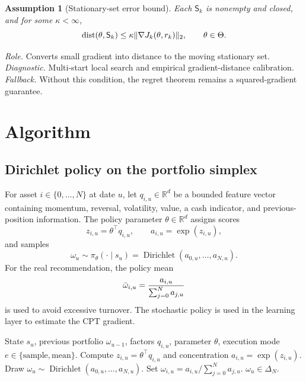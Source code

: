 \documentclass[11pt]{article}
\newtheorem{assumption}[theorem]{Assumption}
\newcommand{\R}{\mathbb R}
\newcommand{\1}{\mathbf 1}
\newcommand{\dist}{\operatorname{dist}}
\DeclarePairedDelimiter{\norm}{\lVert}{\rVert}
\newcommand{\ThetaSet}{\Theta}
\newcommand{\CPT}{\ensuremath{\mathrm{CPT}}\xspace}
\newcommand{\Dir}{\operatorname{Dirichlet}}
\newcommand{\Sta}{\mathsf S}
\begin{document}
\begin{assumption}[Stationary-set error bound]\label{ass:error-bound}
Each $\Sta_k$ is nonempty and closed, and for some $\kappa<\infty$,
\begin{equation}\label{eq:error-bound}
 \dist(\theta,\Sta_k)\le \kappa\norm{\nabla J_k(\theta,r_k)}_2,
 \qquad \theta\in\ThetaSet.
\end{equation}
\end{assumption}
\emph{Role.}  Converts small gradient into distance to the moving stationary set.  \emph{Diagnostic.}  Multi-start local search and empirical gradient-distance calibration.  \emph{Fallback.}  Without this condition, the regret theorem remains a squared-gradient guarantee.

\section{Algorithm}\label{sec:algorithm}

\subsection{Dirichlet policy on the portfolio simplex}

For asset $i\in\{0,\ldots,N\}$ at date $u$, let $q_{i,u}\in\R^d$ be a bounded feature vector containing momentum, reversal, volatility, value, a cash indicator, and previous-position information.  The policy parameter $\theta\in\R^d$ assigns scores
\begin{equation}\label{eq:dir-score}
 z_{i,u}=\theta^\top q_{i,u},\qquad a_{i,u}=\exp(z_{i,u}),
\end{equation}
and samples
\begin{equation}\label{eq:dirichlet-policy}
 \omega_u\sim\pi_\theta(\cdot\mid s_u)=\Dir(a_{0,u},\ldots,a_{N,u}).
\end{equation}
For the real recommendation, the policy mean
\begin{equation}\label{eq:dirichlet-mean}
 \bar\omega_{i,u}={a_{i,u}\over\sum_{j=0}^{N}a_{j,u}}
\end{equation}
is used to avoid excessive turnover.  The stochastic policy is used in the learning layer to estimate the \CPT gradient.

\begin{algorithm}[t]
\caption{Dirichlet factor policy for portfolio generation}\label{alg:dirichlet}
\begin{algorithmic}[1]
\Require State $s_u$, previous portfolio $\omega_{u-1}$, factors $q_{i,u}$, parameter $\theta$, execution mode $e\in\{\mathrm{sample},\mathrm{mean}\}$.
    \State Compute $z_{i,u}=\theta^\top q_{i,u}$ and concentration $a_{i,u}=\exp(z_{i,u})$.
\EndFor
{}
    \State Draw $\omega_u\sim\Dir(a_{0,u},\ldots,a_{N,u})$.
\Else
    \State Set $\omega_{i,u}=a_{i,u}/\sum_{j=0}^{N}a_{j,u}$.
\EndIf
\State \Return $\omega_u\in\Delta_N$.
\end{algorithmic}
\end{algorithm}
\end{document}
